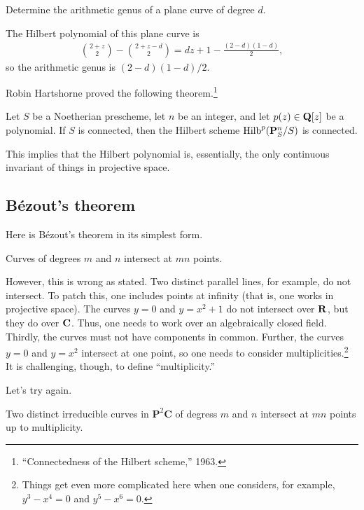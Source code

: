 \documentclass [11 pt, oneside, margin = 1 in] {article}
\begin{document}
\begin{problem}
	Determine the arithmetic genus of a plane curve of degree $d$.
\end{problem}

The Hilbert polynomial of this plane curve is
\begin{align*}
	\binom{2+z}{2} - \binom{2+z-d}{2} = dz + 1 - \frac{(2-d) (1-d)}{2},
\end{align*}
so the arithmetic genus is $(2-d) (1-d)/2$.

Robin Hartshorne proved the following theorem.\footnote{``Connectedness of the Hilbert scheme,'' 1963.}

\begin{theorem}[Hartshorne]\label{}\index{}\text{}
Let $S$ be a Noetherian prescheme, let $n$ be an integer, and let $p(z)\in\mathbf Q [z]$ be a polynomial. If $S$ is connected, then the Hilbert scheme $\operatorname{Hilb}^p(\mathbf{P}^n_S/S)$ is connected.
\end{theorem}

This implies that the Hilbert polynomial is, essentially, the only continuous invariant of things in projective space.

\subsection{B\'ezout's theorem}
Here is B\'ezout's theorem in its simplest form.
\begin{theorem}[B\'ezout]\label{b_1}\text{}
Curves of degrees $m$ and $n$ intersect at $mn$ points.
\end{theorem}
However, this is wrong as stated. Two distinct parallel lines, for example, do not intersect. To patch this, one includes points at infinity (that is, one works in projective space). The curves $y=0$ and $y=x^2+1$ do not intersect over $\mathbf R$, but they do over $\mathbf C$. Thus, one needs to work over an algebraically closed field. Thirdly, the curves must not have components in common. Further, the curves $y=0$ and $y=x^2$ intersect at one point, so one needs to consider multiplicities.\footnote{Things get even more complicated here when one considers, for example, $y^3-x^4=0$ and $y^5 - x^6=0$.} It is challenging, though, to define ``multiplicity.''

Let's try again.

\begin{theorem}[B\'ezout]\label{b_2}\text{}
Two distinct irreducible curves in $\mathbf{P}^2\mathbf{C}$ of degress $m$ and $n$ intersect at $mn$ points up to multiplicity.
\end{theorem}
\end{document}
